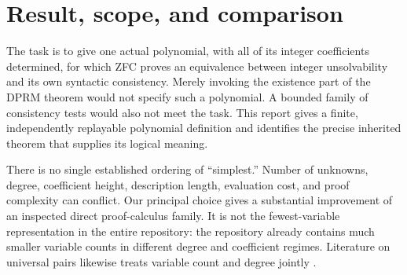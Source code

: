 \documentclass[11pt]{article}
\theoremstyle{definition}\newtheorem{definition}[theorem]{Definition}
\theoremstyle{remark}\newtheorem{remark}[theorem]{Remark}
\begin{document}
\begin{abstract}
We construct a fixed polynomial over the integers whose integer
unsolvability is equivalent, provably in ZFC, to syntactic consistency of
ZFC. The principal polynomial has 85 unrestricted integer unknowns, exact
total degree 16,964, and a division-free evaluator with 1,788 live binary
operations. Its 24 residual squares and all polynomial reconstruction maps
are specified explicitly. The construction combines the cofinal CRT
anchor of ProveIt package 173 with the joint signed-index and power
certificate of package 176. Eleven old certificate coordinates are
replaced by one; 124 further coordinates are eliminated using acyclic
equations with unit coefficients. Each of these 124 coordinate
reconstructions is an integer polynomial.
The new composition retains the numerical C222 proof calculus and has no
K215 simulation, Jones polynomial, or large encoded-machine coefficient
tuple. We separate the unbounded number-theoretic and logical proof from
finite algebra verification, give exact degree and variable-dependence
certificates, and record the larger literal coefficients introduced by
the CRT-anchor parent. The result improves selected inspected direct
variable/degree/circuit bounds; equations in fewer variables already exist
in other regimes. A restricted investigation of additional Pell centers
is included to explain why a plausible competing route did not improve
its parent degree.
\end{abstract}

\setcounter{tocdepth}{1}
\tableofcontents
\newpage
\section{Result, scope, and comparison}
\label{sec:result}

The task is to give one actual polynomial, with all of its integer
coefficients determined, for which ZFC proves an equivalence between
integer unsolvability and its own syntactic consistency. Merely invoking
the existence part of the DPRM theorem would not specify such a
polynomial. A bounded family of consistency tests would also not meet
the task. This report gives a finite, independently replayable polynomial
definition and identifies the precise inherited theorem that supplies
its logical meaning.

There is no single established ordering of ``simplest.'' Number of
unknowns, degree, coefficient height, description length, evaluation
cost, and proof complexity can conflict. Our principal choice gives a
substantial improvement of an inspected direct proof-calculus family.
It is not the fewest-variable representation in the entire repository:
the repository already contains much smaller variable counts in
different degree and coefficient regimes. Literature on universal pairs
likewise treats variable count and degree jointly \cite{bayer2026}.
\end{document}
